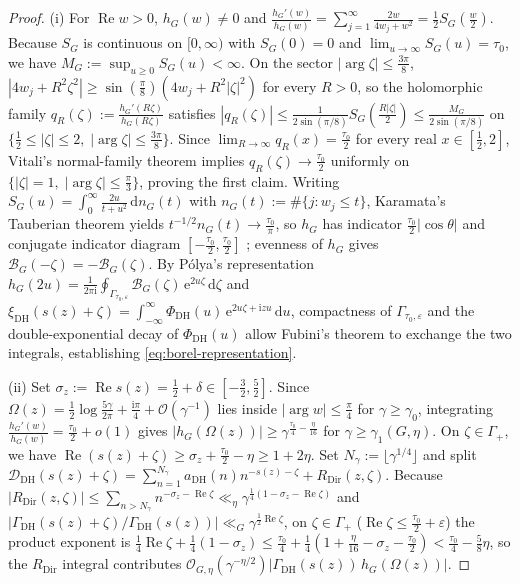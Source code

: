 \documentclass[11pt,a4paper,reqno]{amsart}
\theoremstyle{definition}
\theoremstyle{remark}
\numberwithin{equation}{section}
\newcommand{\dd}{\mathrm{d}}
\newcommand{\ii}{\mathrm{i}}
\newcommand{\ee}{\mathrm{e}}
\DeclareMathOperator{\Reop}{Re}
\begin{document}
\begin{proof}
(i) For $\Reop w > 0$, $h_G(w) \ne 0$ and $\frac{h_G'(w)}{h_G(w)} = \sum_{j=1}^{\infty}\frac{2w}{4w_j + w^2} = \frac{1}{2}S_G(\frac{w}{2})$. Because $S_G$ is continuous on $[0,\infty)$ with $S_G(0) = 0$ and $\lim_{u\to\infty} S_G(u) = \tau_0$, we have $M_G := \sup_{u \ge 0} S_G(u) < \infty$. On the sector $|\arg\zeta| \le \frac{3\pi}{8}$, $|4w_j + R^2\zeta^2| \ge \sin(\frac{\pi}{8})(4w_j + R^2|\zeta|^2)$ for every $R > 0$, so the holomorphic family $q_R(\zeta) := \frac{h_G'(R\zeta)}{h_G(R\zeta)}$ satisfies $|q_R(\zeta)| \le \frac{1}{2\sin(\pi/8)}S_G(\frac{R|\zeta|}{2}) \le \frac{M_G}{2\sin(\pi/8)}$ on $\{\frac{1}{2} \le |\zeta| \le 2,\; |\arg\zeta| \le \frac{3\pi}{8}\}$. Since $\lim_{R\to\infty} q_R(x) = \frac{\tau_0}{2}$ for every real $x \in [\frac{1}{2}, 2]$, Vitali's normal-family theorem implies $q_R(\zeta) \to \frac{\tau_0}{2}$ uniformly on $\{|\zeta| = 1,\; |\arg\zeta| \le \frac{\pi}{3}\}$, proving the first claim. Writing $S_G(u) = \int_{0}^{\infty}\frac{2u}{t + u^2}\,\dd n_G(t)$ with $n_G(t) := \#\{j : w_j \le t\}$, Karamata's Tauberian theorem yields $t^{-1/2}n_G(t) \to \frac{\tau_0}{\pi}$, so $h_G$ has indicator $\frac{\tau_0}{2}|\cos\theta|$ \cite[Ch.~II, Thm.~2]{levin1980} and conjugate indicator diagram $[-\frac{\tau_0}{2}, \frac{\tau_0}{2}]$ \cite[Thm.~5.4.1]{boas1954}; evenness of $h_G$ gives $\mathcal{B}_G(-\zeta) = -\mathcal{B}_G(\zeta)$. By P\'olya's representation $h_G(2u) = \frac{1}{2\pi\ii}\oint_{\Gamma_{\tau_0,\varepsilon}}\mathcal{B}_G(\zeta)\,\ee^{2u\zeta}\,\dd\zeta$ and $\xi_{\mathrm{DH}}(s(z)+\zeta) = \int_{-\infty}^{\infty}\Phi_{\mathrm{DH}}(u)\,\ee^{2u\zeta + \ii z u}\,\dd u$, compactness of $\Gamma_{\tau_0,\varepsilon}$ and the double-exponential decay of $\Phi_{\mathrm{DH}}(u)$ allow Fubini's theorem to exchange the two integrals, establishing \eqref{eq:borel-representation}.

(ii) Set $\sigma_z := \Reop s(z) = \frac{1}{2} + \delta \in [-\frac{3}{2}, \frac{5}{2}]$. Since $\Omega(z) = \frac{1}{2}\log\frac{5\gamma}{2\pi} + \frac{\ii\pi}{4} + \mathcal{O}(\gamma^{-1})$ lies inside $|\arg w| \le \frac{\pi}{4}$ for $\gamma \ge \gamma_0$, integrating $\frac{h_G'(w)}{h_G(w)} = \frac{\tau_0}{2} + o(1)$ gives $|h_G(\Omega(z))| \ge \gamma^{\frac{\tau_0}{4} - \frac{\eta}{16}}$ for $\gamma \ge \gamma_1(G,\eta)$. On $\zeta \in \Gamma_+$, we have $\Reop(s(z)+\zeta) \ge \sigma_z + \frac{\tau_0}{2} - \eta \ge 1 + 2\eta$. Set $N_\gamma := \lfloor\gamma^{1/4}\rfloor$ and split $\mathcal{D}_{\mathrm{DH}}(s(z)+\zeta) = \sum_{n=1}^{N_\gamma} a_{\mathrm{DH}}(n) n^{-s(z)-\zeta} + R_{\mathrm{Dir}}(z,\zeta)$. Because $|R_{\mathrm{Dir}}(z,\zeta)| \le \sum_{n > N_\gamma} n^{-\sigma_z - \Reop\zeta} \ll_\eta \gamma^{\frac{1}{4}(1 - \sigma_z - \Reop\zeta)}$ and $|\Gamma_{\mathrm{DH}}(s(z)+\zeta)/\Gamma_{\mathrm{DH}}(s(z))| \ll_G \gamma^{\frac{1}{2}\Reop\zeta}$, on $\zeta \in \Gamma_+$ ($\Reop\zeta \le \frac{\tau_0}{2} + \varepsilon$) the product exponent is $\frac{1}{4}\Reop\zeta + \frac{1}{4}(1 - \sigma_z) \le \frac{\tau_0}{4} + \frac{1}{4}(1 + \frac{\eta}{16} - \sigma_z - \frac{\tau_0}{2}) < \frac{\tau_0}{4} - \frac{5}{8}\eta$, so the $R_{\mathrm{Dir}}$ integral contributes $\mathcal{O}_{G,\eta}(\gamma^{-\eta/2})|\Gamma_{\mathrm{DH}}(s(z))\,h_G(\Omega(z))|$.


\end{proof}
\end{document}
